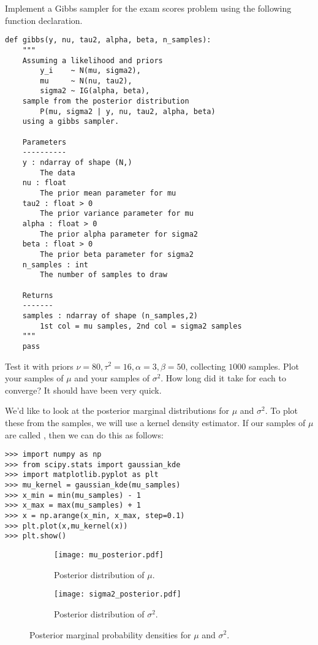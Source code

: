 \begin{problem}
Implement a Gibbs sampler for the exam scores problem using the following function declaration.
\begin{lstlisting}
def gibbs(y, nu, tau2, alpha, beta, n_samples):
    """
    Assuming a likelihood and priors
        y_i    ~ N(mu, sigma2),
        mu     ~ N(nu, tau2),
        sigma2 ~ IG(alpha, beta),
    sample from the posterior distribution
        P(mu, sigma2 | y, nu, tau2, alpha, beta)
    using a gibbs sampler.

    Parameters
    ----------
    y : ndarray of shape (N,)
        The data
    nu : float
        The prior mean parameter for mu
    tau2 : float > 0
        The prior variance parameter for mu
    alpha : float > 0
        The prior alpha parameter for sigma2
    beta : float > 0
        The prior beta parameter for sigma2
    n_samples : int
        The number of samples to draw

    Returns
    -------
    samples : ndarray of shape (n_samples,2)
        1st col = mu samples, 2nd col = sigma2 samples
    """
    pass
\end{lstlisting}
Test it with priors $\nu=80, \tau^{2} = 16, \alpha = 3, \beta = 50$, collecting $1000$ samples. Plot your samples of $\mu$ and your samples of $\sigma^{2}$. How long did it take for each to converge? It should have been very quick.
\end{problem}

We'd like to look at the posterior marginal distributions for $\mu$ and $\sigma^2$.
To plot these from the samples, we will use a kernel density estimator.
If our samples of $\mu$ are called , then we can do this as follows:
\begin{lstlisting}
>>> import numpy as np
>>> from scipy.stats import gaussian_kde
>>> import matplotlib.pyplot as plt
>>> mu_kernel = gaussian_kde(mu_samples)
>>> x_min = min(mu_samples) - 1
>>> x_max = max(mu_samples) + 1
>>> x = np.arange(x_min, x_max, step=0.1)
>>> plt.plot(x,mu_kernel(x))
>>> plt.show()
\end{lstlisting}

\begin{figure}
	\begin{subfigure}[b]{.49\textwidth}
		\texttt{[image: mu\_posterior.pdf]}
		\caption{Posterior distribution of $\mu$.}
	\end{subfigure}
	\begin{subfigure}[b]{.49\textwidth}
		\texttt{[image: sigma2\_posterior.pdf]}
		\caption{Posterior distribution of $\sigma^2$.}
	\end{subfigure}
\caption{Posterior marginal probability densities for $\mu$ and $\sigma^2$.}
\label{fig:post}
\end{figure}

